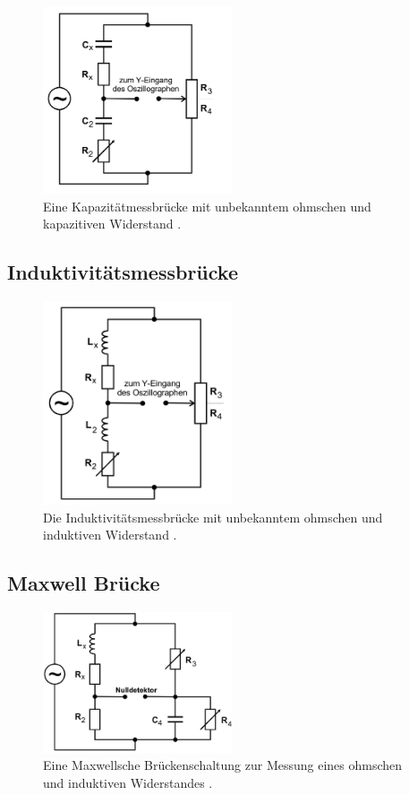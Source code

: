 \begin{figure}
    \centering
    \includegraphics[width=0.5\textwidth]{pictures/Schaltung3.png}
    \caption{Eine Kapazitätmessbrücke mit unbekanntem ohmschen und kapazitiven Widerstand \cite[5]{v302}.}
    \label{fig:Schaltung3}
\end{figure}

\subsection{Induktivitätsmessbrücke}

\begin{figure}
    \centering
    \includegraphics[width=0.5\textwidth]{pictures/Schaltung4.png}
    \caption{Die Induktivitätsmessbrücke mit unbekanntem ohmschen und induktiven Widerstand \cite[6]{v302}.}
    \label{fig:Schaltung4}
\end{figure}

\subsection{Maxwell Brücke}
\begin{figure}
    \centering
    \includegraphics[width=0.5\textwidth]{pictures/Schaltung5.png}
    \caption{Eine Maxwellsche Brückenschaltung zur Messung eines ohmschen und induktiven Widerstandes \cite[7]{v302}.}
    \label{fig:Schaltung5}
\end{figure}



